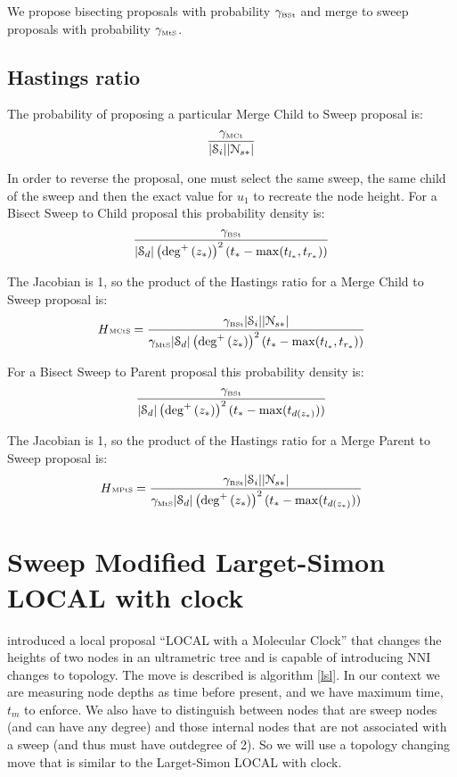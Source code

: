 \documentclass[letterpaper]{article}
\newcommand{\sweeptime}[1]{{\ensuremath{t_{#1}}}}
\newcommand{\sweeploc}[1]{{\ensuremath{z_{#1}}}}
\newcommand{\internalConnectedSweepSet}{{\ensuremath{\mathcal{S}_i}}}
\newcommand{\outdegConnectedSweepSet}{{\ensuremath{\mathcal{S}_d}}}
\newcommand{\outdegree}[1]{{\ensuremath{\deg^{+}\left(#1\right)}}}
\newcommand{\propProb}[1]{{\ensuremath{\gamma_{\mbox{\tiny #1}}}}}
\newcommand{\hastings}[1]{{\ensuremath{H{\mbox{\tiny #1}}}}}
\begin{document}
We propose bisecting proposals with probability $\propProb{BSt}$ and merge to sweep proposals with probability $\propProb{MtS}$.

\subsection{Hastings ratio}
The probability of proposing a particular Merge Child to Sweep proposal is:
\[ \frac{\propProb{MCt}}{| \internalConnectedSweepSet | |\mathcal{N}_{s*}|}\]

In order to reverse the proposal, one must select the same sweep, the same child of the sweep and then the exact value for $u_1$ to recreate the node height.
For a Bisect Sweep to Child proposal this probability density is:
\[ \frac{\propProb{BSt}}{| \outdegConnectedSweepSet | \left(\outdegree{\sweeploc{*}}\right)^2(\sweeptime{*} - \max(t_{l_*},t_{r_*}))}\]

The Jacobian is 1, so the product of the Hastings ratio for a Merge Child to Sweep proposal is:
\[ \hastings{MCtS} =\frac{\propProb{BSt}| \internalConnectedSweepSet | |\mathcal{N}_{s*}|}{\propProb{MtS}| \outdegConnectedSweepSet | \left(\outdegree{\sweeploc{*}}\right)^2(\sweeptime{*} - \max(t_{l_*},t_{r_*}))}\]

For a Bisect Sweep to Parent proposal this probability density is:
\[ \frac{\propProb{BSt}}{| \outdegConnectedSweepSet | \left(\outdegree{\sweeploc{*}}\right)^2(\sweeptime{*} - \max({t_{d(\sweeploc{*})}}))}\]

The Jacobian is 1, so the product of the Hastings ratio for a Merge Parent to Sweep proposal is:
\[ \hastings{MPtS} =  \frac{\propProb{BSt}| \internalConnectedSweepSet | |\mathcal{N}_{s*}|}{\propProb{MtS}| \outdegConnectedSweepSet | \left(\outdegree{\sweeploc{*}}\right)^2(\sweeptime{*} - \max({t_{d(\sweeploc{*})}}))}\]

\section{Sweep Modified Larget-Simon LOCAL with clock}
\citet{LargetS1999} introduced a local proposal ``LOCAL with a Molecular Clock'' that changes the heights of two nodes in an ultrametric tree and is capable of introducing NNI changes to topology.
The move is described is algorithm \ref{lsl}.
In our context we are measuring node depths as time before present, and we have maximum time, $t_m$ to enforce.  We also have to distinguish between nodes that are sweep nodes (and can have any degree) and those internal nodes that are not associated with a sweep (and thus must have outdegree of 2).
So we will use a topology changing move that is similar to the Larget-Simon LOCAL with clock.
\end{document}
